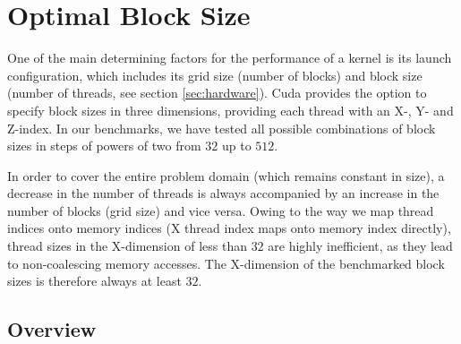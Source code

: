 \section{Optimal Block Size} \label{sec:res-blocksize}



One of the main determining factors for the performance of a kernel is its launch configuration, which includes its grid size (number of blocks) and block size (number of threads, see section \ref{sec:hardware}). Cuda provides the option to specify block sizes in three dimensions, providing each thread with an X-, Y- and Z-index. In our benchmarks, we have tested all possible combinations of block sizes in steps of powers of two from $32$ up to $512$.

In order to cover the entire problem domain (which remains constant in size), a decrease in the number of threads is always accompanied by an increase in the number of blocks (grid size) and vice versa. Owing to the way we map thread indices onto memory indices (X thread index maps onto memory index directly), thread sizes in the X-dimension of less than $32$ are highly inefficient, as they lead to non-coalescing memory accesses. The X-dimension of the benchmarked block sizes is therefore always at least $32$.

\subsection{Overview}

